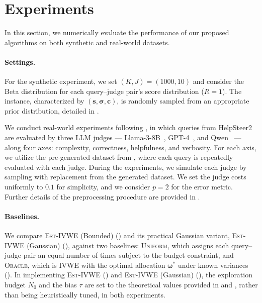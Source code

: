 \documentclass{article}
\def\vc{{\bm{c}}}
\def\vs{{\bm{s}}}
\theoremstyle{plain}
\theoremstyle{definition}
\theoremstyle{plain}
\newcommand{\estivwe}{\textsc{Est-IVWE}}
\begin{document}
\section{Experiments}
\label{sec:experiments}

In this section, we numerically evaluate the performance of our proposed algorithms on both synthetic and real-world datasets.



\paragraph{Settings.}
For the synthetic experiment, we set \((K,J)=(1000,10)\) and consider the Beta distribution for each query--judge pair's score distribution ($R = 1$).
The instance, characterized by $(\vs, \bm\sigma, \vc)$, is randomly sampled from an appropriate prior distribution, detailed in .

We conduct real-world experiments following \citet{saha2026budget}, in which queries from HelpSteer2~\citep{NEURIPS2024_02fd91a3} are evaluated by three LLM judges --- Llama-3-8B~\citep{Llama}, GPT-4~\citep{GPT4}, and Qwen~\citep{Qwen2.5} --- along four axes: complexity, correctness, helpfulness, and verbosity.
For each axis, we utilize the pre-generated dataset from \citet{saha2026budget}, where each query is repeatedly evaluated with each judge.
During the experiments, we simulate each judge by sampling with replacement from the generated dataset.
We set the judge costs uniformly to \(0.1\) for simplicity, and we consider $p = 2$ for the error metric.
Further details of the preprocessing procedure are provided in .


\paragraph{Baselines.}
We compare \estivwe{} (Bounded) () and its practical Gaussian variant, \estivwe{} (Gaussian) (), against two baselines: \textsc{Uniform}, which assigns each query--judge pair an equal number of times subject to the budget constraint, and \textsc{Oracle}, which is IVWE with the optimal allocation \(\bm\omega^*\) under known variances ().
In implementing \estivwe{} () and \estivwe{} (Gaussian) (), the exploration budget $N_0$ and the bias $\tau$ are set to the theoretical values provided in  and , rather than being heuristically tuned, in both experiments.
\end{document}
